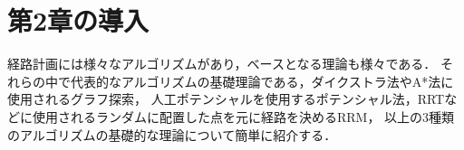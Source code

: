 
\section{第2章の導入}

経路計画には様々なアルゴリズムがあり，ベースとなる理論も様々である．
それらの中で代表的なアルゴリズムの基礎理論である，ダイクストラ法やA*法に使用されるグラフ探索，
人工ポテンシャルを使用するポテンシャル法，RRTなどに使用されるランダムに配置した点を元に経路を決めるRRM，
以上の3種類のアルゴリズムの基礎的な理論について簡単に紹介する．

\newpage
